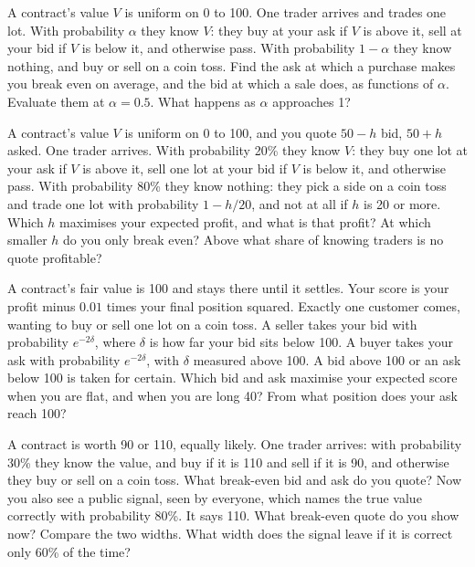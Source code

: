 \begin{question}\label{iq:iv2:making-a-market:24}
A contract's value $V$ is uniform on 0 to 100. One trader arrives and trades one lot. With probability $\alpha$ they know $V$: they buy at your ask if $V$ is above it, sell at your bid if $V$ is below it, and otherwise pass. With probability $1 - \alpha$ they know nothing, and buy or sell on a coin toss. Find the ask at which a purchase makes you break even on average, and the bid at which a sale does, as functions of $\alpha$. Evaluate them at $\alpha = 0.5$. What happens as $\alpha$ approaches 1?
\end{question}

\begin{question}\label{iq:iv2:making-a-market:25}
A contract's value $V$ is uniform on 0 to 100, and you quote $50 - h$ bid, $50 + h$ asked. One trader arrives. With probability 20\% they know $V$: they buy one lot at your ask if $V$ is above it, sell one lot at your bid if $V$ is below it, and otherwise pass. With probability 80\% they know nothing: they pick a side on a coin toss and trade one lot with probability $1 - h/20$, and not at all if $h$ is 20 or more. Which $h$ maximises your expected profit, and what is that profit? At which smaller $h$ do you only break even? Above what share of knowing traders is no quote profitable?
\end{question}

\begin{question}\label{iq:iv2:making-a-market:26}
A contract's fair value is 100 and stays there until it settles. Your score is your profit minus $0.01$ times your final position squared. Exactly one customer comes, wanting to buy or sell one lot on a coin toss. A seller takes your bid with probability $e^{-2\delta}$, where $\delta$ is how far your bid sits below 100. A buyer takes your ask with probability $e^{-2\delta}$, with $\delta$ measured above 100. A bid above 100 or an ask below 100 is taken for certain. Which bid and ask maximise your expected score when you are flat, and when you are long 40? From what position does your ask reach 100?
\end{question}

\begin{question}\label{iq:iv2:making-a-market:27}
A contract is worth 90 or 110, equally likely. One trader arrives: with probability 30\% they know the value, and buy if it is 110 and sell if it is 90, and otherwise they buy or sell on a coin toss. What break-even bid and ask do you quote? Now you also see a public signal, seen by everyone, which names the true value correctly with probability 80\%. It says 110. What break-even quote do you show now? Compare the two widths. What width does the signal leave if it is correct only 60\% of the time?
\end{question}

